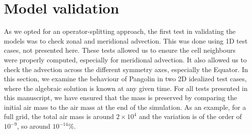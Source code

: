 \section{Model validation}
\label{sec:validation}
As we opted for an operator-splitting approach, the first test in validating the
models was to check zonal and meridional advection. This was done using 1D
test cases, not presented here. These tests allowed us to ensure the cell
neighbours were properly
computed, especially for meridional advection. It also allowed us to check the
advection across the different symmetry axes, especially the Equator.
In this section, we examine the behaviour of Pangolin in two 2D idealized test
cases, where the algebraic solution is known at any given time.  For all tests
presented in this manuscript, we have ensured that the mass is preserved by
comparing the initial air mass to the air mass at the end of the simulation. As
an example, for a full grid, the total air mass is around $2\times 10^{4}$ and
the variation is of the order of $10^{-9}$, so around $10^{-14}\%$.

